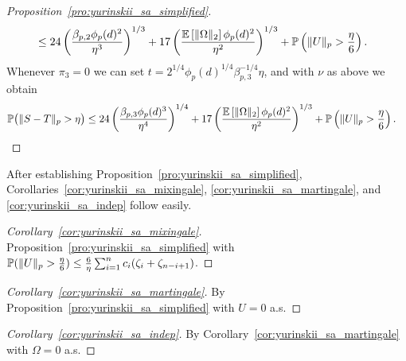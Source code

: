 \begin{proof}[Proposition~\ref{pro:yurinskii_sa_simplified}]
\begin{align*}
    &\leq
    24 \left(
      \frac{\beta_{p,2} \phi_p(d)^2}{\eta^3}
    \right)^{1/3}
    + 17 \left(
      \frac{\E \left[ \|\Omega\|_2 \right] \phi_p(d)^2}{\eta^2}
    \right)^{1/3}
    +\P\left(\|U\|_p>\frac{\eta}{6}\right).
  \end{align*}
  Whenever $\pi_3 = 0$ we can set
  $t = 2^{1/4} \phi_p(d)^{1/4} \beta_{p,3}^{-1/4} \eta$,
  and with $\nu$ as above we obtain
  \begin{align*}
    \P\big(\|S-T\|_p > \eta\big)
    &\leq
    24 \left(
      \frac{\beta_{p,3} \phi_p(d)^3}{\eta^4}
    \right)^{1/4}
    + 17 \left(
      \frac{\E \left[ \|\Omega\|_2 \right] \phi_p(d)^2}{\eta^2}
    \right)^{1/3}
    +\P\left(\|U\|_p>\frac{\eta}{6}\right).
  \end{align*}
\end{proof}

After establishing Proposition~\ref{pro:yurinskii_sa_simplified},
Corollaries~\ref{cor:yurinskii_sa_mixingale},
\ref{cor:yurinskii_sa_martingale},
and \ref{cor:yurinskii_sa_indep} follow easily.

\begin{proof}[Corollary~\ref{cor:yurinskii_sa_mixingale}]
  Proposition~\ref{pro:yurinskii_sa_simplified} with
  $\P ( \|U\|_p > \frac{\eta}{6} )
  \leq \frac{6}{\eta} \sum_{i=1}^{n} c_i (\zeta_{i} + \zeta_{n-i+1})$.
\end{proof}

\begin{proof}[Corollary~\ref{cor:yurinskii_sa_martingale}]
  By Proposition~\ref{pro:yurinskii_sa_simplified}
  with $U=0$ a.s.
\end{proof}

\begin{proof}[Corollary~\ref{cor:yurinskii_sa_indep}]
  By Corollary~\ref{cor:yurinskii_sa_martingale}
  with $\Omega=0$ a.s.
\end{proof}

